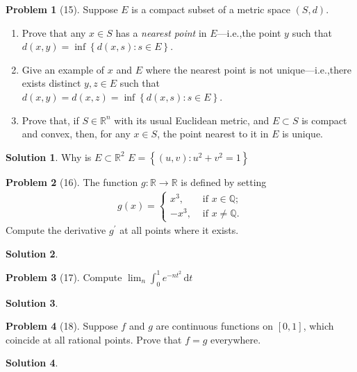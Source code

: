 \documentclass[12pt]{article}
\theoremstyle{definition} %
\newtheorem{solution}{Solution}
\newtheorem{problem}{Problem}
\theoremstyle{plain} %
\begin{document}
\begin{problem}[15]
   Suppose $E$ is a compact subset of a metric space $(S,d)$. 
   \begin{enumerate}
    \item Prove that any $x\in S$ has a \emph{nearest point} in $E$—i.e.,the point $y$ such that $d(x,y)=\inf \left\{ d(x,s):s\in E \right\} $.
    \item Give an example of $x$ and $E$ where the nearest point is not unique—i.e.,there exists distinct $y,z\in E$ such that $d(x,y)=d(x,z)=\inf \left\{ d(x,s) : s\in E \right\} $.
    \item Prove that, if $S\in \mathbb{{R}}^{n}$ with its usual Euclidean metric, and $E \subset S$ is compact and convex, then, for any $x\in S$, the point nearest to it in $E$ is unique.
   \end{enumerate} 
\end{problem}
\begin{solution}
    Why is $E\subset \mathbb{{R}}^{2}$  $E=\left\{ (u,v):u^{2}+v^{2}=1 \right\} $ 
\end{solution}
\begin{problem}[16]
    The function $g: \mathbb{{R}}\to \mathbb{{R}}$ is defined by setting 
    \begin{align}
        g(x) = \begin{cases}
            x^{3}, &\text{ if }  x\in \mathbb{{Q}};\\
            -x^{3}, &\text{ if }  x \neq \mathbb{{Q}}.
        \end{cases}
    \end{align}  
   Compute the derivative $g^\prime $ at all points where it exists.  
\end{problem}
\begin{solution}
    
\end{solution}
\begin{problem}[17]
   Compute $\lim_{n} \int_{0}^{1} e^{-nt^{2}} \,\mathrm{d}t $  
\end{problem}
\begin{solution}
    
\end{solution}
\begin{problem}[18]
   Suppose $f$ and $g$ are continuous functions on $[0,1]$, which coincide at all rational points. Prove that $f=g$ everywhere.  
\end{problem}
\begin{solution}
    
\end{solution}
\end{document}
